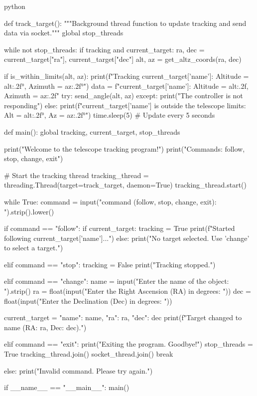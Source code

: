 \begin{sourcecode}[]{python}{}
    
    def track_target():
        """Background thread function to update tracking and send data via socket."""
        global stop_threads
    
        while not stop_threads:
            if tracking and current_target:
                ra, dec = current_target["ra"], current_target["dec"]
                alt, az = get_altz_coords(ra, dec)
    
                if is_within_limits(alt, az):
                    print(f"Tracking {current_target['name']}: Altitude = {alt:.2f}°, Azimuth = {az:.2f}°")
                    data = f"{current_target['name']}: Altitude = {alt:.2f}, Azimuth = {az:.2f}\n"
                    try:
                        send_angle(alt, az)
                    except:
                        print("The controller is not responding")
                else:
                    print(f"{current_target['name']} is outside the telescope limits: Alt = {alt:.2f}°, Az = {az:.2f}°")
            time.sleep(5)  # Update every 5 seconds
    
    
    
    def main():
        global tracking, current_target, stop_threads
    
        print("Welcome to the telescope tracking program!")
        print("Commands: follow, stop, change, exit")
    
        # Start the tracking thread
        tracking_thread = threading.Thread(target=track_target, daemon=True)
        tracking_thread.start()
    
        while True:
            command = input("\nEnter command (follow, stop, change, exit): ").strip().lower()
    
            if command == "follow":
                if current_target:
                    tracking = True
                    print(f"Started following {current_target['name']}...")
                else:
                    print("No target selected. Use 'change' to select a target.")
    
            elif command == "stop":
                tracking = False
                print("Tracking stopped.")
    
            elif command == "change":
                name = input("Enter the name of the object: ").strip()
                ra = float(input("Enter the Right Ascension (RA) in degrees: "))
                dec = float(input("Enter the Declination (Dec) in degrees: "))
    
                current_target = {"name": name, "ra": ra, "dec": dec}
                print(f"Target changed to {name} (RA: {ra}, Dec: {dec}).")
    
            elif command == "exit":
                print("Exiting the program. Goodbye!")
                stop_threads = True
                tracking_thread.join()
                socket_thread.join()
                break
    
            else:
                print("Invalid command. Please try again.")
    
    
    if __name__ == "__main__":
        main()
    
\end{sourcecode}

